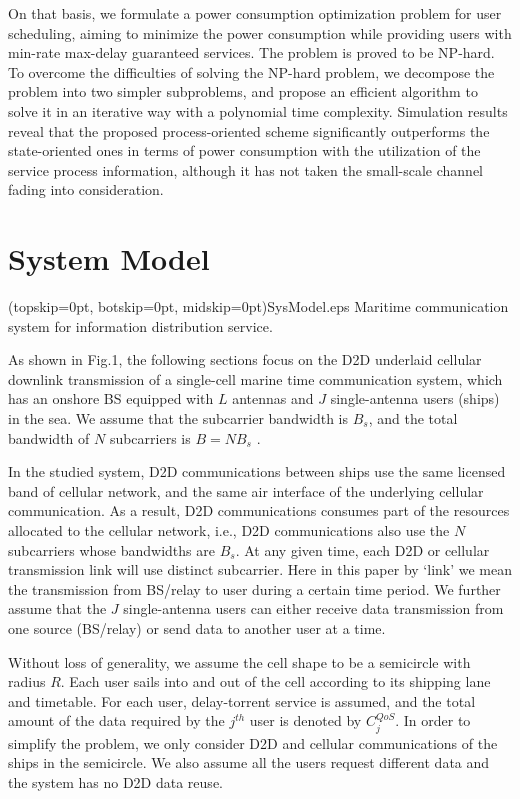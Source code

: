 \documentclass{ieeeaccess}
\begin{document}




On that basis, we formulate a power consumption optimization problem for user scheduling, aiming to minimize the power consumption while providing users with min-rate max-delay guaranteed services. The problem is proved to be NP-hard. To overcome the difficulties of solving the NP-hard problem, we decompose the problem into two simpler subproblems, and propose an efficient algorithm to solve it in an iterative way with a polynomial time complexity.
Simulation results reveal that the proposed process-oriented scheme significantly outperforms the state-oriented ones in terms of power consumption with the utilization of the service process information, although it has not taken the small-scale channel fading into consideration.



\section{System Model}

\Figure[t!](topskip=0pt, botskip=0pt, midskip=0pt){SysModel.eps}
{Maritime communication system for information
distribution service.\label{fig1}}

As shown in Fig.1, the following sections focus on the D2D underlaid cellular downlink transmission of a single-cell marine time communication system, which has an onshore BS equipped with $L$ antennas and  $J$ single-antenna users (ships) in the sea. We assume that the subcarrier bandwidth is ${B_s}$, and the total bandwidth of $N$ subcarriers is $B = N{B_s}$ .

In the studied system, D2D communications between ships use the same licensed band of cellular network, and the same air interface of the underlying cellular communication. As a result, D2D communications consumes part of the resources allocated to the cellular network, i.e., D2D communications also use the $N$ subcarriers whose bandwidths are ${B_s}$. At any given time, each D2D or cellular transmission link will use distinct subcarrier. Here in this paper by `link' we mean the transmission from BS/relay to user during a certain time period. We further assume that the $J$ single-antenna users can either receive data transmission from one source (BS/relay) or send data to another user at a time.

Without loss of generality, we assume the cell shape to be a semicircle with radius $R$. Each user sails into and out of the cell according to its shipping lane and timetable. For each user, delay-torrent service is assumed, and the total amount of the data required by the ${j^{th}}$ user is denoted by $C_j^{QoS}$. In order to simplify the problem, we only consider D2D and cellular communications of the ships in the semicircle. We also assume all the users request different data and the system has no D2D data reuse.
\end{document}
